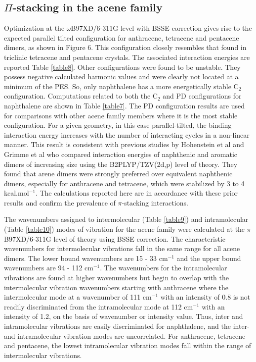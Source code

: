 \subsection{$\Pi$-stacking in the acene family}

Optimization at the $\omega$B97XD/6-311G level with BSSE correction gives rise to the expected parallel tilted configuration \cite{brock1990temperature} for anthracene, tetracene and pentacene dimers, as shown in Figure 6. This configuration closely resembles that found in triclinic tetracene\cite{campbell1962crystal} and pentacene\cite{holmes1999nature} crystals. The associated interaction energies are reported Table \ref{table8}.  Other configurations were found to be unstable. They possess negative calculated harmonic values and were clearly not located at a minimum of the PES. So, only naphthalene has a more energetically stable C$_{2}$ configuration. Computations related to both the C$_{2}$ and PD configurations for naphthalene are shown in Table \ref{table7}. The PD configuration results are used for comparisons with other acene family members where it is the most stable configuration.
For a given geometry, in this case parallel-tilted, the binding interaction energy increases with the number of interacting cycles in a non-linear manner. This result is consistent with previous studies by Hohenstein et al \cite{hohenstein2010density} and Grimme et al\cite{grimme2008special} who compared interaction energies of naphthenic and aromatic dimers of increasing size using the B2PLYP/TZV(2d,p) level of theory. They found that arene dimers were strongly preferred over equivalent naphthenic dimers, especially for anthracene and tetracene, which were stabilized by 3 to 4 kcal.mol$^{-1}$. The calculations reported here are in accordance with these prior results and confirm the prevalence of $\pi$-stacking interactions.  

The wavenumbers assigned to intermolecular (Table \ref{table9}) and intramolecular (Table \ref{table10}) modes of vibration for the acene family were calculated at the $\pi$B97XD/6-311G level of theory using BSSE correction. The characteristic wavenumbers for intermolecular vibrations fall in the same range for all  acene dimers. The lower bound wavenumbers are 15 - 33 cm$^{-1}$ and the upper bound wavenumbers are 94 - 112 cm$^{-1}$. The wavenumbers for the intramolecular vibrations are found at higher wavenumbers but begin to overlap with the intermolecular vibration wavenumbers starting with anthracene where the intermolecular mode at a wavenumber of 111 cm$^{-1}$ with an intensity of 0.8 is not readily discriminated from the intramolecular mode at 112 cm$^{-1}$ with an intensity of 1.2, on the basis of wavenumber or intensity value. Thus, inter and intramolecular vibrations are easily discriminated for naphthalene, and the inter- and intramolecular vibration modes are uncorrelated. For anthracene, tetracene and pentacene, the lowest intramolecular vibration modes fall within the range of intermolecular vibrations.\\ 

